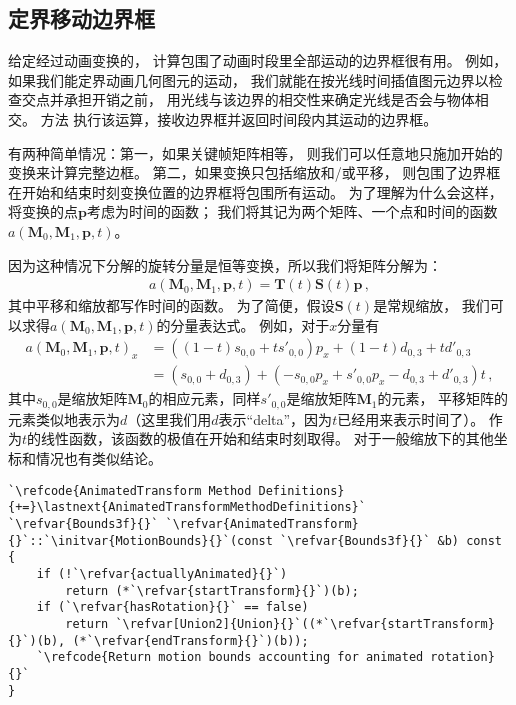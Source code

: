 \subsection{定界移动边界框}\label{sub:定界移动边界框}
给定经过动画变换的，
计算包围了动画时段里全部运动的边界框很有用。
例如，如果我们能定界动画几何图元的运动，
我们就能在按光线时间插值图元边界以检查交点并承担开销之前，
用光线与该边界的相交性来确定光线是否会与物体相交。
方法
执行该运算，接收边界框并返回时间段内其运动的边界框。

有两种简单情况：第一，如果关键帧矩阵相等，
则我们可以任意地只施加开始的变换来计算完整边框。
第二，如果变换只包括缩放和/或平移，
则包围了边界框在开始和结束时刻变换位置的边界框将包围所有运动。
为了理解为什么会这样，将变换的点$\bm p$考虑为时间的函数；
我们将其记为两个矩阵、一个点和时间的函数$a(\bm M_0,\bm M_1,\bm p,t)$。

因为这种情况下分解的旋转分量是恒等变换，所以我们将矩阵分解为：
\begin{align*}
    a(\bm M_0,\bm M_1,\bm p,t)=\bm T(t)\bm S(t)\bm p\, ,
\end{align*}
其中平移和缩放都写作时间的函数。
为了简便，假设$\bm S(t)$是常规缩放，
我们可以求得$a(\bm M_0,\bm M_1,\bm p,t)$的分量表达式。
例如，对于$x$分量有
\begin{align*}
    a(\bm M_0,\bm M_1,\bm p,t)_x & =((1-t)s_{0,0}+ts'_{0,0})p_x+(1-t)d_{0,3}+td'_{0,3}                \\
                                 & =(s_{0,0}+d_{0,3})+(-s_{0,0}p_x+s'_{0,0}p_x-d_{0,3}+d'_{0,3})t\, ,
\end{align*}
其中$s_{0,0}$是缩放矩阵$\bm M_0$的相应元素，同样$s'_{0,0}$是缩放矩阵$\bm M_1$的元素，
平移矩阵的元素类似地表示为$d$（这里我们用$d$表示“delta”，因为$t$已经用来表示时间了）。
作为$t$的线性函数，该函数的极值在开始和结束时刻取得。
对于一般缩放下的其他坐标和情况也有类似结论。
\begin{lstlisting}
`\refcode{AnimatedTransform Method Definitions}{+=}\lastnext{AnimatedTransformMethodDefinitions}`
`\refvar{Bounds3f}{}` `\refvar{AnimatedTransform}{}`::`\initvar{MotionBounds}{}`(const `\refvar{Bounds3f}{}` &b) const {
    if (!`\refvar{actuallyAnimated}{}`)
        return (*`\refvar{startTransform}{}`)(b);
    if (`\refvar{hasRotation}{}` == false)
        return `\refvar[Union2]{Union}{}`((*`\refvar{startTransform}{}`)(b), (*`\refvar{endTransform}{}`)(b));
    `\refcode{Return motion bounds accounting for animated rotation}{}`
}
\end{lstlisting}

